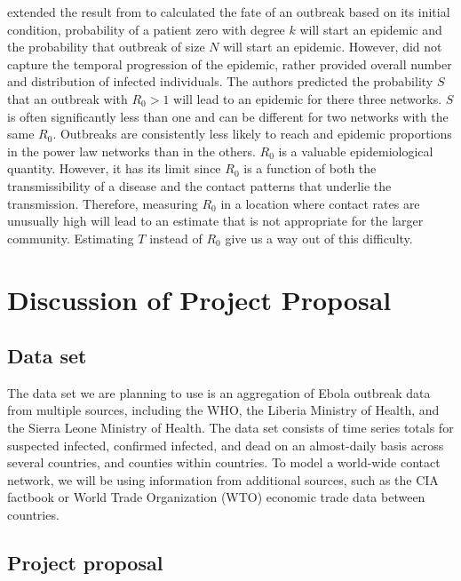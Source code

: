 \documentclass[10pt, journal,onecolumn]{IEEEtran}
\begin{document}
 \citep{meyers2005network} extended the result from \citep{newman2002spread} to calculated the fate of an outbreak based on its initial condition, probability of a patient zero with degree $k$ will start an epidemic and the probability that outbreak of size $N$ will start an epidemic. However, \citep{newman2002spread} did not capture the temporal progression of the epidemic, rather provided overall number and distribution of infected individuals. The authors predicted the probability $S$ that an outbreak with $R_0>1$ will lead to an epidemic for there three networks. $S$ is often significantly less than one and can be different for two networks with the same $R_0$. Outbreaks are consistently less likely to reach and epidemic proportions in the power law networks than in the others. $R_0$ is a valuable epidemiological quantity. However, it has its limit since $R_0$ is a function of both the transmissibility of a disease and the contact patterns that underlie the transmission. Therefore, measuring $R_0$ in a location where contact rates are unusually high will lead to an estimate that is not appropriate for the larger community.  Estimating $T$ instead of $R_0$ give us a way out of this difficulty.


\bigskip


\section{Discussion of Project Proposal}
\label{sec:ProjectProposal}

\subsection{Data set}

The data set we are planning to use \citep{cmriversdata} is an aggregation of Ebola outbreak data
from multiple sources, including the WHO, the Liberia Ministry of Health, and the Sierra Leone
Ministry of Health. The data set consists of time series totals for suspected infected, confirmed
infected, and dead on an almost-daily basis across several countries, and counties within countries.
To model a world-wide contact network, we will be using information from additional sources, such
as the CIA factbook or World Trade Organization (WTO) economic trade data between countries.



\subsection{Project proposal}
\end{document}
